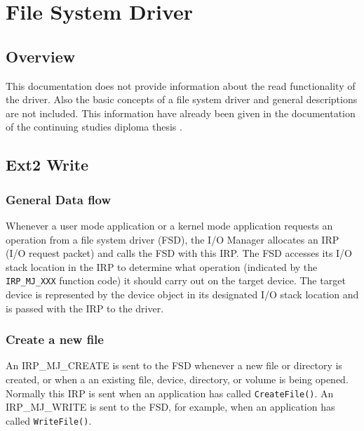 \chapter{File System Driver}
\label{cha:FileSystemDriver}

\section{Overview}
This documentation does not provide information about the read functionality of the driver. Also the basic concepts of a file system driver and general descriptions are not included. This information have already been given in the documentation of the continuing studies diploma thesis \cite{Ext2fuerXP}.

\section{Ext2 Write}
\subsection{General Data flow}
Whenever a user mode application or a kernel mode application requests an operation from a file system driver (FSD), the I/O Manager allocates an IRP (I/O request packet) and calls the FSD with this IRP. The FSD accesses its I/O stack location in the IRP to determine what operation (indicated by the \verb~IRP_MJ_XXX~ function code) it should carry out on the target device. The target device is represented by the device object in its designated I/O stack location and is passed with the IRP to the driver. 

\subsection{Create a new file}
An IRP\_MJ\_CREATE is sent to the FSD whenever a new file or directory is created, or when a an existing file, device, directory, or volume is being opened. Normally this IRP is sent when an application has called \verb~CreateFile()~. An IRP\_MJ\_WRITE is sent to the FSD, for example, when an application has called \verb~WriteFile()~.

